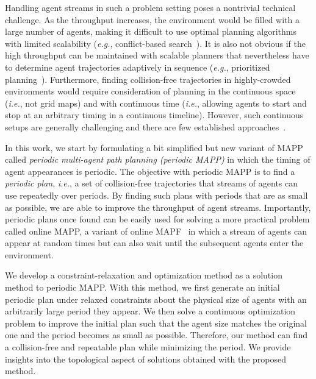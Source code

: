 \documentclass[letterpaper]{article} %
\def\eg{{\it e.g.}}
\def\ie{{\it i.e.}}
\begin{document}
Handling agent streams in such a problem setting poses a nontrivial technical challenge. As the throughput increases, the environment would be filled with a large number of agents, making it difficult to use optimal planning algorithms with limited scalability (\eg, conflict-based search~\cite{sharon2015conflict}). It is also not obvious if the high throughput can be maintained with scalable planners that nevertheless have to determine agent trajectories adaptively in sequence (\eg, prioritized planning~\cite{silver2005cooperative}). Furthermore, finding collision-free trajectories in highly-crowded environments would require consideration of planning in the continuous space (\ie, not grid maps) and with continuous time (\ie, allowing agents to start and stop at an arbitrary timing in a continuous timeline). However, such continuous setups are generally challenging and there are few established approaches~\cite{andreychuk2021improving,andreychuk2022multi,kasaura2022prioritized}.

In this work, we start by formulating a bit simplified but new variant of MAPP called \emph{periodic multi-agent path planning (periodic MAPP)} in which the timing of agent appearances is periodic. The objective with periodic MAPP is to find a \emph{periodic plan}, \ie, a set of collision-free trajectories that streams of agents can use repeatedly over periods. By finding such plans with periods that are as small as possible, we are able to improve the throughput of agent streams.
Importantly, periodic plans once found can be easily used for solving a more practical problem called online MAPP, a variant of online MAPF~\cite{vsvancara2019online} in which a stream of agents can appear at random times but can also wait until the subsequent agents enter the environment.


We develop a constraint-relaxation and optimization method as a solution method to periodic MAPP. With this method, we first generate an initial periodic plan under relaxed constraints about the physical size of agents with an arbitrarily large period they appear. We then solve a continuous optimization problem to improve the initial plan such that the agent size matches the original one and the period becomes as small as possible. Therefore, our method can find a collision-free and repeatable plan while minimizing the period. We provide insights into the topological aspect of solutions obtained with the proposed method.
\end{document}
